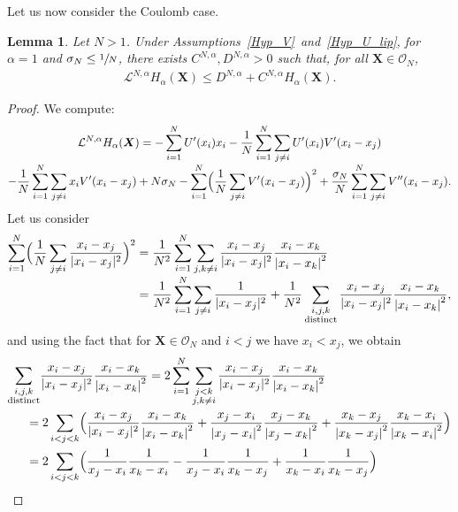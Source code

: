 \documentclass[JEP,XML,SOM,Unicode,published]{cedram}
\newcommand{\bX}{{\boldsymbol{X}}}
\theoremstyle{plain}
\newtheorem{lemma}{Lemma}[section]
\theoremstyle{definition}
\begin{document}
Let us now consider the Coulomb case.
\begin{lemma}\label{lya_alpha_1}
Let $N>1$. Under Assumptions~\ref{Hyp_V}~and~\ref{Hyp_U_lip}, for $\alpha=1$ and $\sigma_N\leq\sfrac{1}{N}$, there exists $C^{N,\alpha}, D^{N,\alpha}>0$ such that, for all $\bX\in\mathcal{O}_N$,
\begin{align*}
\mathcal{L}^{N,\alpha} H_{\alpha}(\bX)\leq D^{N,\alpha}+C^{N,\alpha}H_{\alpha}(\bX).
\end{align*}
\end{lemma}

\begin{proof}
We compute:\vspace*{-7pt}
\begin{multline*}
\mathcal{L}^{N,\alpha} H_{\alpha}(\bX)=-\sum_{i=1}^N U'(x_i)x_i-\frac{1}{N}\sum_{i=1}^N\sum_{j\neq i}U'(x_i)V'(x_i-x_j)\\[-3pt]
-\frac{1}{N}\sum_{i=1}^N\sum_{j\neq i}x_iV'(x_i-x_j)+N\sigma_N-\sum_{i=1}^N\Bigl(\frac{1}{N}\sum_{j\neq i}V'(x_i-x_j)\Bigr)^2+\frac{\sigma_N}{N}\sum_{i=1}^N\sum_{j\neq i}V''(x_i-x_j).
\end{multline*}
Let us consider
\begin{align*}
\sum_{i=1}^N\Bigl(\frac{1}{N}\sum_{j\neq i}\frac{x_i-x_j}{|x_i-x_j|^2}\Bigr)^2&=\frac{1}{N^2}\sum_{i=1}^N\sum_{j,k\neq i}\frac{x_i-x_j}{|x_i-x_j|^2}\frac{x_i-x_k}{\left|x_i-x_k\right|^2}\\[-3pt]
&=\frac{1}{N^2}\sum_{i=1}^N\sum_{j\neq i}\frac{1}{|x_i-x_j|^2}+\frac{1}{N^2}\sum_{\substack{i,j,k\\\text{distinct}}}\frac{x_i-x_j}{|x_i-x_j|^2}\frac{x_i-x_k}{\left|x_i-x_k\right|^2},
\end{align*}
and using the fact that for $\bX\in\mathcal{O}_N$ and $i<j$ we have $x_i<x_j$, we obtain
\begin{align*}
\sum_{\substack{i,j,k\\\text{distinct}}}&\frac{x_i-x_j}{|x_i-x_j|^2}\frac{x_i-x_k}{\left|x_i-x_k\right|^2}
=2\sum_{i=1}^N\sum_{\substack{j<k\\ j,k\neq i}}\frac{x_i-x_j}{|x_i-x_j|^2}\frac{x_i-x_k}{\left|x_i-x_k\right|^2}\\
&\hspace*{-.4cm}=2\sum_{i<j<k}\Bigl(\frac{x_i-x_j}{|x_i-x_j|^2}\frac{x_i-x_k}{\left|x_i-x_k\right|^2}+\frac{x_j-x_i}{\left|x_j-x_i\right|^2}\frac{x_j-x_k}{\left|x_j-x_k\right|^2}+\frac{x_k-x_j}{\left|x_k-x_j\right|^2}\frac{x_k-x_i}{\left|x_k-x_i\right|^2}\Bigr)\\
&\hspace*{-.4cm}=2\sum_{i<j<k}\Bigl(\frac{1}{x_j-x_i}\frac{1}{x_k-x_i}-\frac{1}{x_j-x_i}\frac{1}{x_k-x_j}+\frac{1}{x_k-x_i}\frac{1}{x_k-x_j}\Bigr)\\

\end{align*}
\end{proof}
\end{document}
